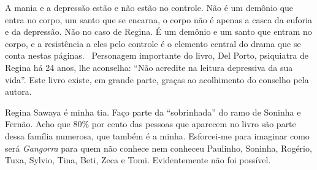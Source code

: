 {A mania e a depressão estão e não estão no controle. Não é um demônio
que entra no corpo, um santo que se encarna, o corpo não é apenas a
casca da euforia e da depressão. Não no caso de Regina. É um demônio e
um santo que entram no corpo, e a resistência a eles pelo controle é o
elemento central do drama que se conta nestas páginas.~ Personagem
importante do livro, Del Porto, psiquiatra de Regina há 24 anos, lhe
aconselha: ``Não acredite na leitura depressiva da sua vida''. Este
livro existe, em grande parte, graças ao acolhimento do conselho pela
autora.}

\asterisc

Regina Sawaya é minha tia. Faço parte da ``sobrinhada'' do ramo de
Soninha e Fernão. Acho que 80\% por cento das pessoas que aparecem no
livro são parte dessa família numerosa, que também é a minha.
Esforcei-me para imaginar como será \emph{Gangorra} para quem não
conhece nem conheceu Paulinho, Soninha, Rogério, Tuxa, Sylvio, Tina,
Beti, Zeca e Tomi. Evidentemente não foi possível.
